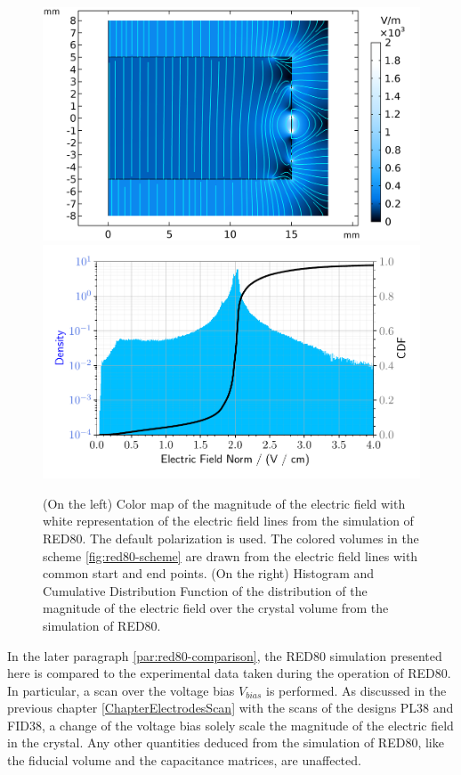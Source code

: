 \begin{figure}
\centering
\includegraphics[align=c, scale=0.5]{Figures/ElectrodesExperimental/efield_red80.png}
\includegraphics[align=c, scale=0.5]{Figures/ElectrodesExperimental/enorm_hist_red80.pdf}
\caption{(On the left) Color map of the magnitude of the electric field with white representation of the electric field lines from the simulation of RED80. The default polarization is used. The colored volumes in the scheme \ref{fig:red80-scheme} are drawn from the electric field lines with common start and end points.
(On the right) Histogram and Cumulative Distribution Function of the distribution of the magnitude of the electric field over the crystal volume from the simulation of RED80.}
\label{fig:red80-efield}
\end{figure}

In the later paragraph \ref{par:red80-comparison}, the RED80 simulation presented here is compared to the experimental data taken during the operation of RED80. In particular, a scan over the voltage bias $V_{bias}$ is performed. As discussed in the previous chapter \ref{ChapterElectrodesScan} with the scans of the designs PL38 and FID38, a change of the voltage bias solely scale the magnitude of the electric field in the crystal. Any other quantities deduced from the simulation of RED80, like the fiducial volume and the capacitance matrices, are unaffected.



